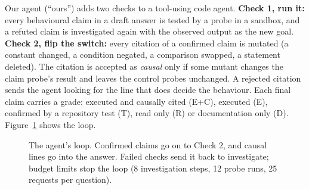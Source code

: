 \documentclass[10pt,a4paper]{article}
\newcommand{\code}[1]{\texttt{\small #1}}
\begin{document}
Our agent (``ours'') adds two checks to a tool-using code agent. \textbf{Check 1, run it:} every behavioural claim in
a draft answer is tested by a probe in a sandbox, and a refuted claim is investigated again with the observed output
as the new goal. \textbf{Check 2, flip the switch:} every citation of a confirmed claim is mutated (a constant
changed, a condition negated, a comparison swapped, a statement deleted). The citation is accepted as \emph{causal}
only if some mutant changes the claim probe's result and leaves the control probes unchanged. A rejected citation
sends the agent looking for the line that does decide the behaviour. Each final claim carries a grade: executed and
causally cited (E+C), executed (E), confirmed by a repository test (T), read only (R) or documentation only (D).
Figure~\ref{fig:loop} shows the loop.

\begin{figure}[!htb]
\centering
{}
\caption{The agent's loop. Confirmed claims go on to Check 2, and causal lines go into the answer. Failed checks send it back to investigate; budget limits stop the loop (8 investigation
steps, 12 probe runs, 25 requests per question).}
\label{fig:loop}
\end{figure}
\end{document}
